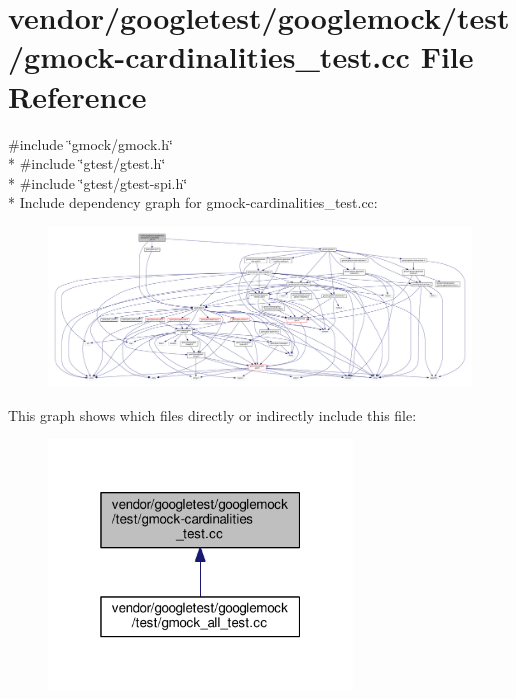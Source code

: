 \hypertarget{gmock-cardinalities__test_8cc}{}\section{vendor/googletest/googlemock/test/gmock-\/cardinalities\+\_\+test.cc File Reference}
\label{gmock-cardinalities__test_8cc}
{\ttfamily \#include \char`\"{}gmock/gmock.\+h\char`\"{}}\\*
{\ttfamily \#include \char`\"{}gtest/gtest.\+h\char`\"{}}\\*
{\ttfamily \#include \char`\"{}gtest/gtest-\/spi.\+h\char`\"{}}\\*
Include dependency graph for gmock-\/cardinalities\+\_\+test.cc\+:\nopagebreak
\begin{figure}[H]
\begin{center}
\leavevmode
\includegraphics[width=350pt]{gmock-cardinalities__test_8cc__incl}
\end{center}
\end{figure}
This graph shows which files directly or indirectly include this file\+:\nopagebreak
\begin{figure}[H]
\begin{center}
\leavevmode
\includegraphics[width=229pt]{gmock-cardinalities__test_8cc__dep__incl}
\end{center}
\end{figure}
